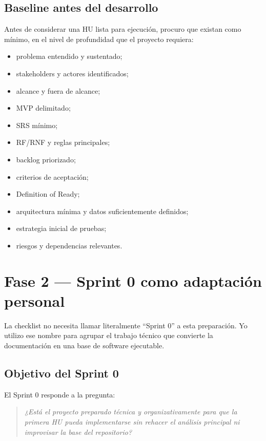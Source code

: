 \documentclass[11pt,a4paper]{article}
\begin{document}
\subsection{Baseline antes del desarrollo}

Antes de considerar una HU lista para ejecución, procuro que existan como mínimo, en el nivel de profundidad que el proyecto requiera:

\begin{itemize}
    \item problema entendido y sustentado;
    \item stakeholders y actores identificados;
    \item alcance y fuera de alcance;
    \item MVP delimitado;
    \item SRS mínimo;
    \item RF/RNF y reglas principales;
    \item backlog priorizado;
    \item criterios de aceptación;
    \item Definition of Ready;
    \item arquitectura mínima y datos suficientemente definidos;
    \item estrategia inicial de pruebas;
    \item riesgos y dependencias relevantes.
\end{itemize}

\section{Fase 2 — Sprint 0 como adaptación personal}

La checklist no necesita llamar literalmente ``Sprint 0'' a esta preparación. Yo utilizo ese nombre para agrupar el trabajo técnico que convierte la documentación en una base de software ejecutable.

\subsection{Objetivo del Sprint 0}

El Sprint 0 responde a la pregunta:

\begin{quote}
\textit{¿Está el proyecto preparado técnica y organizativamente para que la primera HU pueda implementarse sin rehacer el análisis principal ni improvisar la base del repositorio?}
\end{quote}
\end{document}
